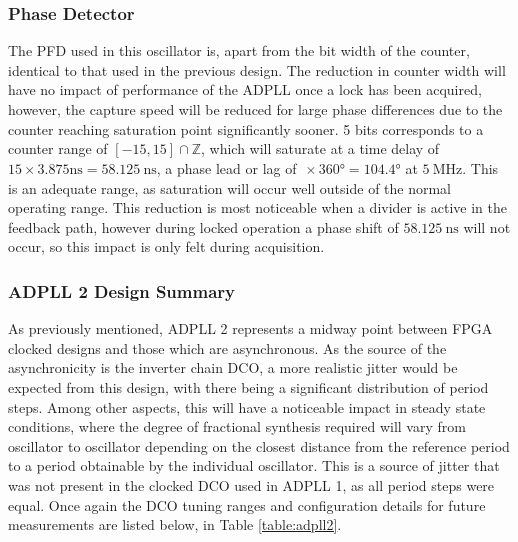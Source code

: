 \subsubsection{Phase Detector}
The \ac{PFD} used in this oscillator is, apart from the bit width of the counter, identical to that used in the previous design. The reduction in counter width will have no impact of performance of the \ac{ADPLL} once a lock has been acquired, however, the capture speed will be reduced for large phase differences due to the counter reaching saturation point significantly sooner. 5 bits corresponds to a counter range of $[-15,15]\cap\mathbb{Z}$, which will saturate at a time delay of $15\times3.875\si{\nano\second} = 58.125~\si{\nano\second}$, a phase lead or lag of $\frac{}{}\times360\si{\degree} = 104.4\si{\degree}$ at $5~\si{\mega\hertz}$. This is an adequate range, as saturation will occur well outside of the normal operating range. This reduction is most noticeable when a divider is active in the feedback path, however during locked operation a phase shift of $58.125~\si{\nano\second}$ will not occur, so this impact is only felt during acquisition.

\subsubsection{\acs{ADPLL} 2 Design Summary}
As previously mentioned, \ac{ADPLL} 2 represents a midway point between \ac{FPGA} clocked designs and those which are asynchronous. As the source of the asynchronicity is the inverter chain \ac{DCO}, a more realistic jitter would be expected from this design, with there being a significant distribution of period steps. Among other aspects, this will have a noticeable impact in steady state conditions, where the degree of fractional synthesis required will vary from oscillator to oscillator depending on the closest distance from the reference period to a period obtainable by the individual oscillator. This is a source of jitter that was not present in the clocked \ac{DCO} used in \ac{ADPLL} 1, as all period steps were equal. Once again the \ac{DCO} tuning ranges and configuration details for future measurements are listed below, in Table \ref{table:adpll2}.

